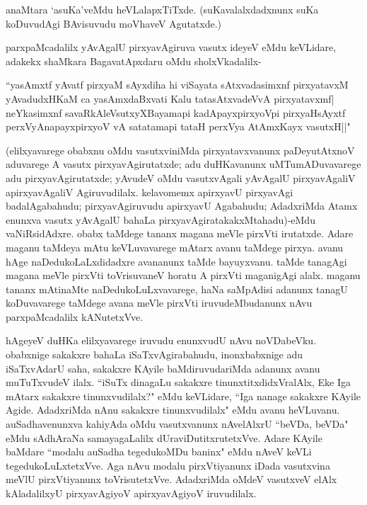 anaMtara `asuKa'veMdu heVLalapxTiTxde. (suKavalalxdadxnunx suKa koDuvudAgi BAvisuvudu moVhaveV Agutatxde.)

parxpaMcadalilx yAvAgalU pirxyavAgiruva vasutx ideyeV eMdu keVLidare, adakekx shaMkara BagavatApxdaru oMdu sholxVkadalilx-

\begin{shloka}
``yasAmxtf yAvatf pirxyaM sAyxdiha hi viSayata sAtxvadasimxnf pirxyatavxM\\
yAvadudxHKaM ca yasAmxdaBxvati Kalu tatasAtxvadeVvA pirxyatavxmf|\\
neYkasimxnf savaRkAleV\s sutxyXBayamapi kadApayxpirxyoV\s pi pirxyaHsAyxtf\\
perxVyAnapayxpirxyoV vA satatamapi tataH perxVya AtAmxKayx vasutxH||"
\end{shloka}

(elilxyavarege obabxnu oMdu vasutxviniMda pirxyatavxvanunx paDeyutAtxnoV aduvarege A vasutx pirxyavAgirutatxde; adu duHKavanunx uMTumADuvavarege adu pirxyavAgirutatxde; yAvudeV oMdu vasutxvAgali yAvAgalU pirxyavAgaliV apirxyavAgaliV Agiruvudilalx. kelavomemx apirxyavU pirxyavAgi badalAgabahudu; pirxyavAgiruvudu apirxyavU Agabahudu; AdadxriMda Atamx enunxva vasutx yAvAgalU bahaLa pirxyavAgiratakakxMtahadu)-eMdu vaNiRsidAdxre. obabx taMdege tananx magana meVle pirxVti irutatxde. Adare maganu taMdeya mAtu keVLuvavarege mAtarx avanu taMdege pirxya. avanu hAge naDedukoLaLxdidadxre avananunx taMde bayuyxvanu. taMde tanagAgi magana meVle pirxVti toVrisuvaneV horatu A pirxVti maganigAgi alalx. maganu tananx mAtinaMte naDedukoLuLxvavarege, haNa saMpAdisi adanunx tanagU koDuvavarege taMdege avana meVle pirxVti iruvudeMbudanunx nAvu parxpaMcadalilx kANutetxVve.

hAgeyeV duHKa elilxyavarege iruvudu enunxvudU nAvu noVDabeVku. obabxnige sakakxre bahaLa iSaTxvAgirabahudu, inonxbabxnige adu iSaTxvAdarU saha, sakakxre KAyile baMdiruvudariMda adanunx avanu muTuTxvudeV ilalx. ``iSuTx dinagaLu sakakxre tinunxtitxdidxVralAlx, Eke Iga mAtarx sakakxre tinunxvudilalx?" eMdu keVLidare, ``Iga nanage sakakxre KAyile Agide. AdadxriMda nAnu sakakxre tinunxvudilalx" eMdu avanu heVLuvanu. auSadhavenunxva kahiyAda oMdu vasutxvanunx nAvelAlxrU ``beVDa, beVDa" eMdu sAdhAraNa samayagaLalilx dUraviDutitxrutetxVve. Adare KAyile baMdare ``modalu auSadha tegedukoMDu baninx" eMdu nAveV keVLi tegedukoLuLxtetxVve. Aga nAvu modalu pirxVtiyanunx iDada vasutxvina meVlU pirxVtiyanunx toVrisutetxVve. AdadxriMda oMdeV vasutxveV elAlx kAladalilxyU pirxyavAgiyoV apirxyavAgiyoV iruvudilalx.

